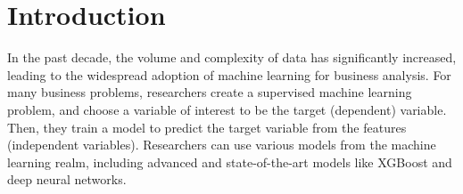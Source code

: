 \documentclass[11pt]{article}    %
\begin{document}
\newpage
\section{Introduction}




In the past decade, the volume and complexity of data has significantly increased, leading to the widespread adoption of machine learning for business analysis. For many business problems, researchers create a supervised machine learning problem, and choose a variable of interest to be the target (dependent) variable. Then, they train a model to predict the target variable from the features (independent variables). Researchers can use various models from the machine learning realm, including advanced and state-of-the-art models like XGBoost and deep neural networks. 
\end{document}
